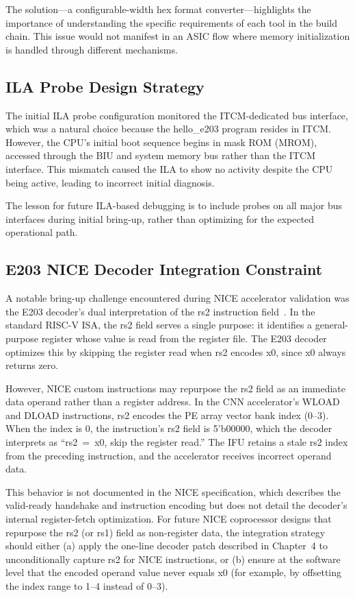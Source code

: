 The solution---a configurable-width hex format converter---highlights the importance of understanding the specific requirements of each tool in the build chain. This issue would not manifest in an ASIC flow where memory initialization is handled through different mechanisms.


\subsection{ILA Probe Design Strategy}

The initial ILA probe configuration monitored the ITCM-dedicated bus interface, which was a natural choice because the hello\_e203 program resides in ITCM. However, the CPU's initial boot sequence begins in mask ROM (MROM), accessed through the BIU and system memory bus rather than the ITCM interface. This mismatch caused the ILA to show no activity despite the CPU being active, leading to incorrect initial diagnosis.


The lesson for future ILA-based debugging is to include probes on all major bus interfaces during initial bring-up, rather than optimizing for the expected operational path.

\subsection{E203 NICE Decoder Integration Constraint}\label{sec:5_1_4}

A notable bring-up challenge encountered during NICE accelerator validation was the E203 decoder's dual interpretation of the rs2 instruction field~\cite{NUCLEI_NICE}. In the standard RISC-V ISA, the rs2 field serves a single purpose: it identifies a general-purpose register whose value is read from the register file. The E203 decoder optimizes this by skipping the register read when rs2 encodes x0, since x0 always returns zero.

However, NICE custom instructions may repurpose the rs2 field as an immediate data operand rather than a register address. In the CNN accelerator's WLOAD and DLOAD instructions, rs2 encodes the PE array vector bank index (0--3). When the index is 0, the instruction's rs2 field is 5'b00000, which the decoder interprets as ``rs2~=~x0, skip the register read.'' The IFU retains a stale rs2 index from the preceding instruction, and the accelerator receives incorrect operand data.

This behavior is not documented in the NICE specification, which describes the valid-ready handshake and instruction encoding but does not detail the decoder's internal register-fetch optimization. For future NICE coprocessor designs that repurpose the rs2 (or rs1) field as non-register data, the integration strategy should either (a) apply the one-line decoder patch described in Chapter~4 to unconditionally capture rs2 for NICE instructions, or (b) ensure at the software level that the encoded operand value never equals x0 (for example, by offsetting the index range to 1--4 instead of 0--3).

